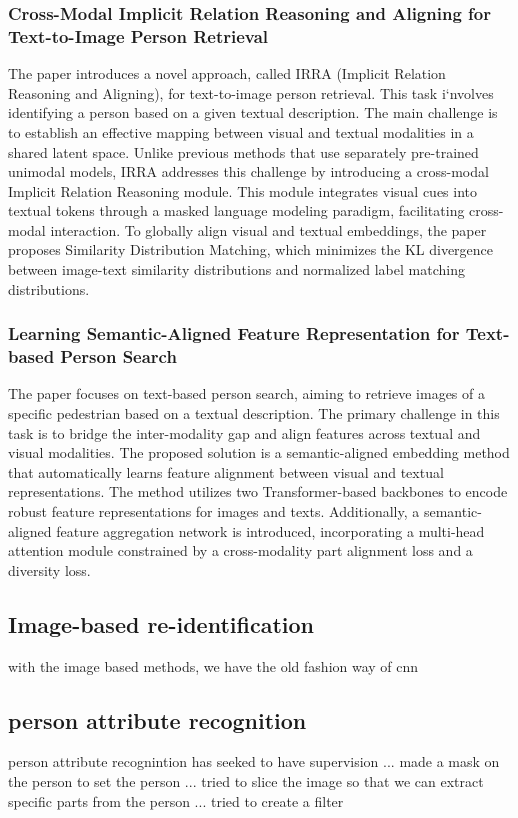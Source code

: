 \subsubsection{Cross-Modal Implicit Relation Reasoning and Aligning for Text-to-Image Person Retrieval}
The paper introduces a novel approach, called IRRA (Implicit Relation Reasoning and Aligning), for text-to-image person retrieval. This task i`nvolves identifying a person based on a given textual description. The main challenge is to establish an effective mapping between visual and textual modalities in a shared latent space. Unlike previous methods that use separately pre-trained unimodal models, IRRA addresses this challenge by introducing a cross-modal Implicit Relation Reasoning module. This module integrates visual cues into textual tokens through a masked language modeling paradigm, facilitating cross-modal interaction. To globally align visual and textual embeddings, the paper proposes Similarity Distribution Matching, which minimizes the KL divergence between image-text similarity distributions and normalized label matching distributions. 

\subsubsection{Learning Semantic-Aligned Feature Representation for Text-based Person Search}
The paper focuses on text-based person search, aiming to retrieve images of a specific pedestrian based on a textual description. The primary challenge in this task is to bridge the inter-modality gap and align features across textual and visual modalities. The proposed solution is a semantic-aligned embedding method that automatically learns feature alignment between visual and textual representations. The method utilizes two Transformer-based backbones to encode robust feature representations for images and texts. Additionally, a semantic-aligned feature aggregation network is introduced, incorporating a multi-head attention module constrained by a cross-modality part alignment loss and a diversity loss. 


\subsection{Image-based re-identification}
with the image based methods, we have the old fashion way of cnn 


\subsection{person attribute recognition}
person attribute recognintion has seeked to have supervision 
... made a mask on the person to set the person 
... tried to slice the image so that we can extract specific parts from the person
... tried to create a filter 

